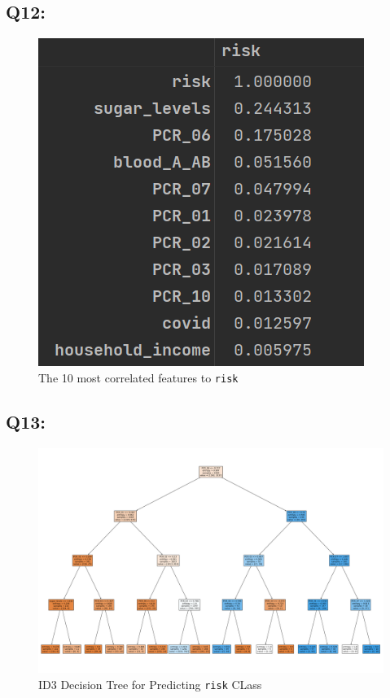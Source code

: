 \documentclass{article}
\newcommand{\code}[1]{\texttt{#1}}
\begin{document}
\subsection*{Q12:}
    \begin{figure}[H]
        \centering
        \includegraphics{images/q12.png}
        \caption{The 10 most correlated features to \code{risk}}
        \label{fig:q12}
    \end{figure}
\subsection*{Q13:}
    \begin{figure}[H]
        \centering
        \includegraphics[scale=0.32]{q13.png}
        \caption{ID3 Decision Tree for Predicting \code{risk} CLass}
        \label{fig:q13}
    \end{figure}
\end{document}
